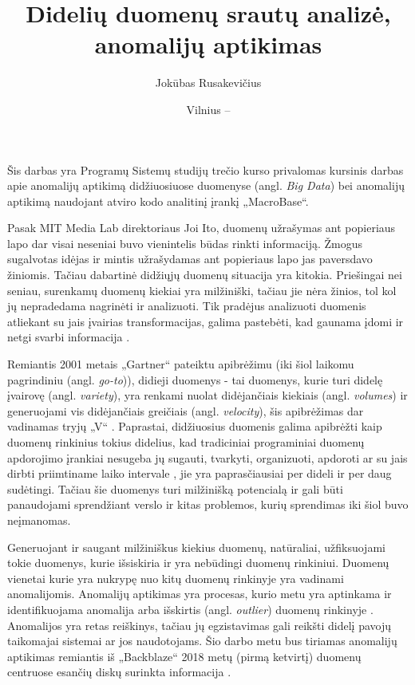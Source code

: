 \documentclass{VUMIFPSkursinis}
\title{Didelių duomenų srautų analizė, anomalijų aptikimas}
\author{Jokūbas Rusakevičius}
\date{Vilnius – \the\year}
\begin{document}
\maketitle

\setcounter{page}{2}

\tableofcontents

Šis darbas yra Programų Sistemų studijų trečio kurso privalomas kursinis darbas apie anomalijų aptikimą didžiuosiuose duomenyse (angl. \textit{Big Data}) bei anomalijų aptikimą naudojant atviro kodo analitinį įrankį „MacroBase“.

Pasak MIT Media Lab direktoriaus Joi Ito, duomenų užrašymas ant popieriaus lapo dar visai neseniai buvo vienintelis būdas rinkti informaciją. Žmogus sugalvotas idėjas ir mintis užrašydamas ant popieriaus lapo jas paversdavo žiniomis. Tačiau dabartinė didžiųjų duomenų situacija yra kitokia. Priešingai nei seniau, surenkamų duomenų kiekiai yra milžiniški, tačiau jie nėra žinios, tol kol jų nepradedama nagrinėti ir analizuoti. Tik pradėjus analizuoti duomenis atliekant su jais įvairias transformacijas, galima pastebėti, kad gaunama įdomi ir netgi svarbi informacija \cite{documentary}. \par

Remiantis 2001 metais „Gartner“ pateiktu apibrėžimu (iki šiol laikomu pagrindiniu (angl. \textit{go-to})), didieji duomenys - tai duomenys, kurie turi didelę įvairovę (angl. \textit{variety}), yra renkami nuolat didėjančiais kiekiais (angl. \textit{volumes}) ir generuojami vis didėjančiais greičiais (angl. \textit{velocity}), šis apibrėžimas dar vadinamas tryjų „V“ \cite{three_vs}. Paprastai, didžiuosius duomenis galima apibrėžti kaip duomenų rinkinius tokius didelius, kad tradiciniai programiniai duomenų apdorojimo įrankiai nesugeba jų sugauti, tvarkyti, organizuoti, apdoroti ar su jais dirbti priimtiname laiko intervale \cite{bigdata_tolerable_time}, jie yra paprasčiausiai per dideli ir per daug sudėtingi. Tačiau šie duomenys turi milžinišką potencialą ir gali būti panaudojami sprendžiant verslo ir kitas problemos, kurių sprendimas iki šiol buvo neįmanomas.\par

Generuojant ir saugant milžiniškus kiekius duomenų, natūraliai, užfiksuojami tokie duomenys, kurie išsiskiria ir yra nebūdingi duomenų rinkiniui. Duomenų vienetai kurie yra nukrypę nuo kitų duomenų rinkinyje yra vadinami anomalijomis. Anomalijų aptikimas yra procesas, kurio metu yra aptinkama ir identifikuojama anomalija arba išskirtis (angl. \textit{outlier}) duomenų rinkinyje \cite{anomaly}. Anomalijos yra retas reiškinys, tačiau jų egzistavimas gali reikšti didelį pavojų taikomajai sistemai ar jos naudotojams. Šio darbo metu bus tiriamas anomalijų aptikimas remiantis iš „Backblaze“ 2018 metų (pirmą ketvirtį) duomenų centruose esančių diskų surinkta informacija \cite{backblaze}.\par
\end{document}
